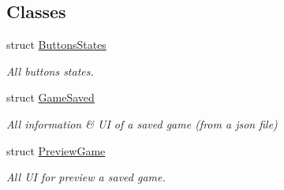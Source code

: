 \subsection*{Classes}
\begin{DoxyCompactItemize}
\item 
struct \hyperlink{struct_scene_load_game_1_1_buttons_states}{Buttons\+States}
\begin{DoxyCompactList}\small\item\em All buttons states. \end{DoxyCompactList}\item 
struct \hyperlink{struct_scene_load_game_1_1_game_saved}{Game\+Saved}
\begin{DoxyCompactList}\small\item\em All information \& UI of a saved game (from a json file) \end{DoxyCompactList}\item 
struct \hyperlink{struct_scene_load_game_1_1_preview_game}{Preview\+Game}
\begin{DoxyCompactList}\small\item\em All UI for preview a saved game. \end{DoxyCompactList}\end{DoxyCompactItemize}
